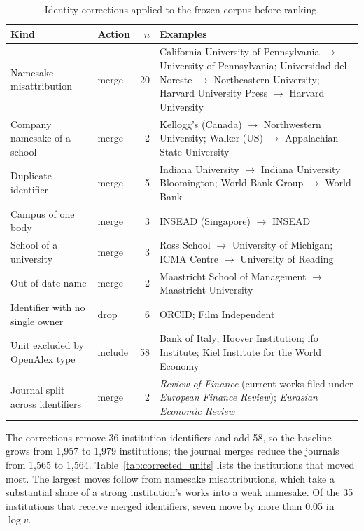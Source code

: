 \begin{table}[!htbp]
  \centering
  \small
  \caption{Identity corrections applied to the frozen corpus before ranking.}
  \label{tab:corrections}
  \begin{tabular}{@{}llrp{7.6cm}@{}}
    \toprule
    Kind & Action & $n$ & Examples \\
    \midrule
    Namesake misattribution & merge & 20 & California University of Pennsylvania $\to$ University of Pennsylvania; Universidad del Noreste $\to$ Northeastern University; Harvard University Press $\to$ Harvard University \\
    Company namesake of a school & merge & 2 & Kellogg's (Canada) $\to$ Northwestern University; Walker (US) $\to$ Appalachian State University \\
    Duplicate identifier & merge & 5 & Indiana University $\to$ Indiana University Bloomington; World Bank Group $\to$ World Bank \\
    Campus of one body & merge & 3 & INSEAD (Singapore) $\to$ INSEAD \\
    School of a university & merge & 3 & Ross School $\to$ University of Michigan; ICMA Centre $\to$ University of Reading \\
    Out-of-date name & merge & 2 & Maastricht School of Management $\to$ Maastricht University \\
    Identifier with no single owner & drop & 6 & ORCID; Film Independent \\
    Unit excluded by OpenAlex type & include & 58 & Bank of Italy; Hoover Institution; ifo Institute; Kiel Institute for the World Economy \\
    \midrule
    Journal split across identifiers & merge & 2 & \textit{Review of Finance} (current works filed under \textit{European Finance Review}); \textit{Eurasian Economic Review} \\
    \bottomrule
  \end{tabular}
\end{table}

The corrections remove 36 institution identifiers and add 58, so the baseline grows from 1,957 to 1,979 institutions; the journal merges reduce the journals from 1,565 to 1,564. Table~\ref{tab:corrected_units} lists the institutions that moved most. The largest moves follow from namesake misattributions, which take a substantial share of a strong institution's works into a weak namesake. Of the 35 institutions that receive merged identifiers, seven move by more than 0.05 in $\log v$.

